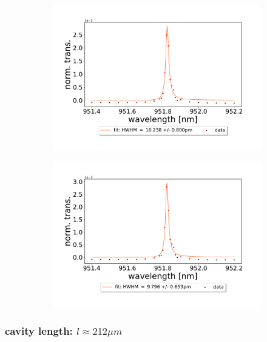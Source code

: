 \begin{figure}[h!]
\begin{subfigure}[b]{0.49\textwidth}
        \caption{}
        \label{fig:380um_M5_fit_2}
    \end{subfigure}
    \begin{subfigure}[b]{0.49\textwidth}
        \includegraphics[width=\textwidth]{figures/results/single fano fits/380um_M5_fit_3.pdf}
        \caption{}
        \label{fig:380um_M5_fit_3}
    \end{subfigure}
    \begin{subfigure}[b]{0.49\textwidth}
        \includegraphics[width=\textwidth]{figures/results/single fano fits/380um_M5_fit_4.pdf}
        \caption{}
        \label{fig:380um_M5_fit_4}
    \end{subfigure}
\end{figure}

\clearpage
\subsubsection*{cavity length: $l \approx 212 \mu m$}

